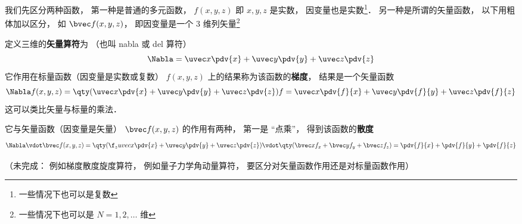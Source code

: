 

我们先区分两种函数， 第一种是普通的多元函数， $f(x, y, z)$ 即 $x, y, z$ 是实数， 因变量也是实数\footnote{一些情况下也可以是复数}． 另一种是所谓的矢量函数， 以下用粗体加以区分， 如 $\bvec f(x, y, z)$， 即因变量是一个 3 维列矢量\footnote{一些情况下也可以是 $N = 1, 2, \dots$ 维}

定义三维的\textbf{矢量算符}为 （也叫 nabla 或 del 算符）
\begin{equation}
\Nabla = \uvec x \pdv{x} + \uvec y \pdv{y} + \uvec z \pdv{z}
\end{equation}
它作用在标量函数（因变量是实数或复数） $f(x, y, z)$ 上的结果称为该函数的\textbf{梯度}， 结果是一个矢量函数
\begin{equation}
\Nabla f(x, y, z) = \qty(\uvec x \pdv{x} + \uvec y \pdv{y} + \uvec z \pdv{z}) f = \uvec x \pdv{f}{x} + \uvec y \pdv{f}{y} + \uvec z \pdv{f}{z}
\end{equation}
这可以类比矢量与标量的乘法．

它与矢量函数（因变量是矢量） $\bvec f(x, y, z)$ 的作用有两种， 第一是 “点乘”， 得到该函数的\textbf{散度}
\begin{equation}
\Nabla \vdot \bvec f(x, y, z) = \qty(\f_zuvec x \pdv{x} + \uvec y \pdv{y} + \uvec z \pdv{z}) \vdot \qty(\bvec x f_x + \bvec y f_y + \bvec z f_z) = \pdv{f}{x} + \pdv{f}{y} + \pdv{f}{z}
\end{equation}


（未完成： 例如梯度散度旋度算符， 例如量子力学角动量算符， 要区分对矢量函数作用还是对标量函数作用）

